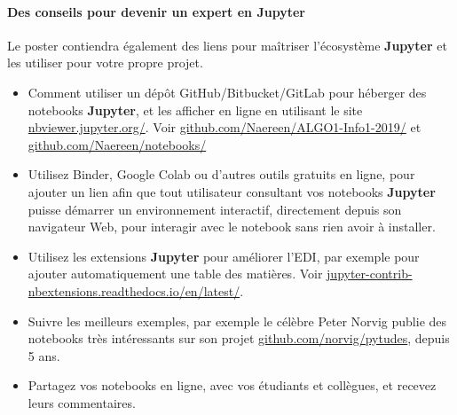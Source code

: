\documentclass[runningheads]{llncs}
\newcommand{\Jupyter}{\textbf{Jupyter}}
\begin{document}




\paragraph{Des conseils pour devenir un expert en \Jupyter}

Le poster contiendra également des liens pour maîtriser l'écosystème \Jupyter{} et les utiliser pour votre propre projet.

\begin{itemize}
    \item Comment utiliser un dépôt GitHub/Bitbucket/GitLab pour héberger des notebooks \Jupyter{}, et les afficher en ligne en utilisant le site \url{nbviewer.jupyter.org/}.
    Voir \url{github.com/Naereen/ALGO1-Info1-2019/} et \url{github.com/Naereen/notebooks/}
    \item Utilisez Binder, Google Colab ou d'autres outils gratuits en ligne, pour ajouter un lien afin que tout utilisateur consultant vos notebooks \Jupyter{} puisse démarrer un environnement interactif, directement depuis son navigateur Web, pour interagir avec le notebook sans rien avoir à installer.
    \item Utilisez les extensions \Jupyter{} pour améliorer l'EDI, par exemple pour ajouter automatiquement une table des matières. Voir \url{jupyter-contrib-nbextensions.readthedocs.io/en/latest/}.
    \item Suivre les meilleurs exemples, par exemple le célèbre Peter Norvig publie des notebooks très intéressants sur son projet \url{github.com/norvig/pytudes}, depuis 5 ans.
    \item Partagez vos notebooks en ligne, avec vos étudiants et collègues, et recevez leurs commentaires.
\end{itemize}
\end{document}
